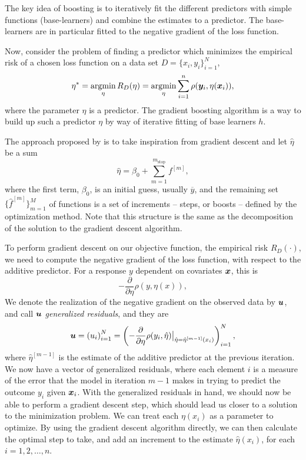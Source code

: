 The key idea of boosting is to iteratively fit the different predictors with simple functions (base-learners) and combine the estimates to a predictor.
The base-learners are in particular fitted to the negative gradient of the loss function.

Now, consider the problem of finding a predictor which minimizes the empirical risk of a chosen loss function on a data set
$D=\{x_i,y_i\}_{i=1}^N$,
\begin{equation}\label{eq:argmin-eta}
    \eta^*=\operatorname*{argmin}_{\eta}R_D(\eta)=\operatorname*{argmin}_{\eta}\sum_{i=1}^n\rho(\bm{y}_i,\eta(\bm{x}_i)),
\end{equation}
where the parameter $\eta$ is a predictor.
The gradient boosting algorithm is a way to build up such a predictor $\eta$ by way of iterative fitting of base learners $h$.

The approach proposed by \citet{friedman2001} is to take inspiration from gradient descent and let $\hat{\eta}$ be a sum
\begin{equation}
    \hat{\eta}=\beta_0+\sum_{m=1}^{m_{\text{stop}}}f^{[m]},
\end{equation}
where the first term, $\beta_0$, is an initial guess, usually $\overline{y}$, and the remaining set $\{\hat{f}^{[m]}\}_{m=1}^M$ of 
functions is a set of increments -- steps, or boosts -- defined by the optimization method. Note that this structure
is the same as the decomposition of the solution to the gradient descent algorithm.

To perform gradient descent on our objective function, the empirical risk $R_D(\cdot)$,
we need to compute the negative gradient of the loss function, with respect to the additive predictor. For a response $y$ dependent on
covariates $\bm{x}$, this is
\begin{equation}
    -\frac{\partial}{\partial\eta} \rho(y,\eta(x)),
\end{equation}
We denote the realization of the negative gradient on the observed data by $\bm{u}$, and call $\bm{u}$ \textit{generalized residuals}, and they are
\begin{equation}
    \bm{u}=\left(u_i\right)_{i=1}^N=\left(-\frac{\partial}{\partial \eta}\rho(y_i, \hat{\eta})\big\rvert_{\hat{\eta}=\hat{\eta}^{[m-1]}(x_i)}\right)_{i=1}^N,
\end{equation}
where $\hat{\eta}^{[m-1]}$ is the estimate of the additive predictor at the previous iteration.
We now have a vector of generalized residuals, where each element $i$ is a measure of the error that the model in iteration $m-1$ makes
in trying to predict the outcome $y_i$ given $\bm{x}_i$.
With the generalized residuals in hand, we should now be able to perform a gradient descent step, which should lead us closer to a solution
to the minimization problem. We can treat each $\eta(x_i)$ as a parameter to optimize. By using the gradient descent algorithm directly, we
can then calculate the optimal step to take, and add an increment to the estimate $\hat{\eta}(x_i)$, for each $i=1,2,\ldots,n$.

